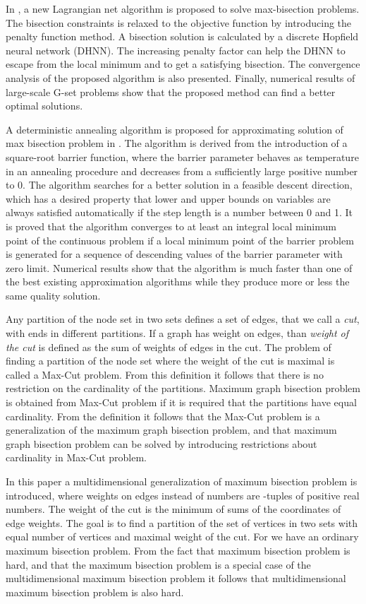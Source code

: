 \documentclass[10pt]{article}
\begin{document}
In \cite{fengmin}, a new Lagrangian net algorithm is proposed to solve max-bisection problems. 
The bisection constraints is relaxed to the objective function by introducing the penalty
function method. A bisection solution is calculated by a discrete Hopfield neural
network (DHNN). The increasing penalty factor can help the DHNN to escape from the
local minimum and to get a satisfying bisection. The convergence analysis of the proposed
algorithm is also presented. Finally, numerical results of large-scale G-set problems show
that the proposed method can find a better optimal solutions.

A deterministic annealing algorithm is proposed for approximating solution of max bisection problem in \cite{dang}. The algorithm is derived from the introduction of a square-root barrier function, where the barrier parameter behaves as temperature in an annealing procedure and decreases from a sufficiently large positive number to 0. The algorithm searches for a better solution in a feasible descent direction, which has a desired property that lower and upper bounds on variables are always satisfied automatically if the step length is a number between 0 and 1. It is proved that the algorithm converges to at least an integral local minimum point of the continuous problem if a local minimum point of the barrier problem is generated for a sequence of descending values of the barrier parameter with zero limit. Numerical results show that the algorithm is much faster than one of the best existing approximation algorithms while they produce more or less the same quality solution.




Any partition of the node set  in two sets defines a set of edges, that we call a {\it cut}, with ends in different partitions. If a graph has weight on edges, than {\it weight of the cut} 
is defined as the sum of weights of edges in the cut. The problem of finding a partition
of the node set where the weight of the cut is maximal is called a Max-Cut problem. From this
definition it follows that there is no restriction on the cardinality of the partitions. 
Maximum graph bisection problem is obtained from Max-Cut problem
if it is required that the partitions have equal cardinality. From the definition 
it follows that the Max-Cut problem is a generalization of the maximum graph bisection problem,
and that maximum graph bisection problem can be solved by introducing 
restrictions about cardinality in Max-Cut problem.

In this paper a multidimensional generalization of maximum bisection problem is introduced, where weights on edges 
instead of numbers are -tuples of positive real numbers. The weight of the cut is the minimum
of sums of  the  coordinates of edge weights. The goal is to find a partition of the set of vertices 
in two sets with equal number of vertices and maximal weight of the cut. For  we have an ordinary maximum bisection problem. From the fact that maximum bisection problem is  hard, and that the maximum bisection problem is a special case of the multidimensional maximum bisection problem it follows that multidimensional maximum bisection problem is also  hard.
\end{document}
